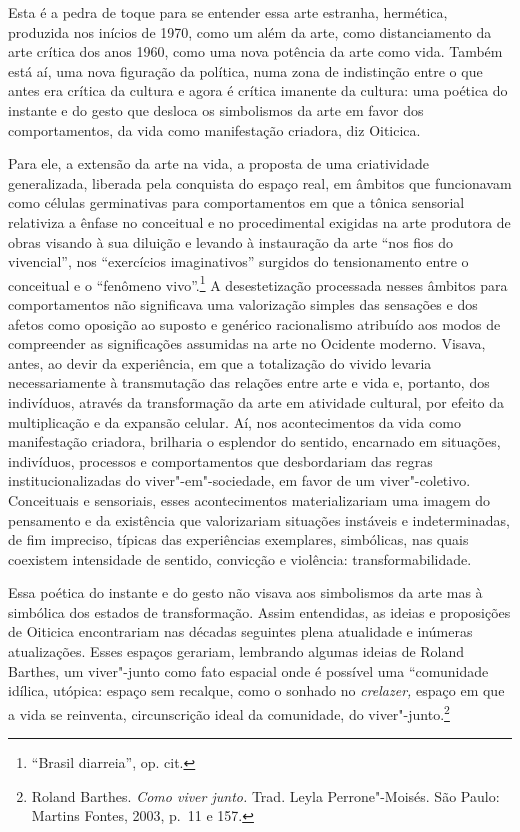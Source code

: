 Esta é a pedra de toque para se entender essa arte estranha, hermética,
produzida nos inícios de 1970, como um além da arte, como distanciamento
da arte crítica dos anos 1960, como uma nova potência da arte como vida.
Também está aí, uma nova figuração da política, numa zona de indistinção
entre o que antes era crítica da cultura e agora é crítica imanente da
cultura: uma poética do instante e do gesto que desloca os simbolismos
da arte em favor dos comportamentos, da vida como manifestação criadora,
diz Oiticica.

Para ele, a extensão da arte na vida, a proposta de uma criatividade
generalizada, liberada pela conquista do espaço real, em âmbitos que
funcionavam como células germinativas para comportamentos em que a
tônica sensorial relativiza a ênfase no conceitual e no procedimental
exigidas na arte produtora de obras visando à sua diluição e levando à
instauração da arte ``nos fios do vivencial'', nos ``exercícios
imaginativos'' surgidos do tensionamento entre o conceitual e o
``fenômeno vivo''.\footnote{``Brasil diarreia'', op. cit.} A
desestetização processada nesses âmbitos para comportamentos não
significava uma valorização simples das sensações e dos afetos como
oposição ao suposto e genérico racionalismo atribuído aos modos de
compreender as significações assumidas na arte no Ocidente moderno.
Visava, antes, ao devir da experiência, em que a totalização do vivido
levaria necessariamente à transmutação das relações entre arte e vida e,
portanto, dos indivíduos, através da transformação da arte em atividade
cultural, por efeito da multiplicação e da expansão celular. Aí, nos
acontecimentos da vida como manifestação criadora, brilharia o esplendor
do sentido, encarnado em situações, indivíduos, processos e
comportamentos que desbordariam das regras institucionalizadas do
viver"-em"-sociedade, em favor de um viver"-coletivo. Conceituais e
sensoriais, esses acontecimentos materializariam uma imagem do
pensamento e da existência que valorizariam situações instáveis e
indeterminadas, de fim impreciso, típicas das experiências exemplares,
simbólicas, nas quais coexistem intensidade de sentido, convicção e
violência: transformabilidade.

Essa poética do instante e do gesto não visava aos simbolismos da arte
mas à simbólica dos estados de transformação. Assim entendidas, as
ideias e proposições de Oiticica encontrariam nas décadas seguintes
plena atualidade e inúmeras atualizações. Esses espaços gerariam,
lembrando algumas ideias de Roland Barthes, um viver"-junto como fato
espacial onde é possível uma ``comunidade idílica, utópica: espaço sem
recalque, como o sonhado no \emph{crelazer,} espaço em que a vida se
reinventa, circunscrição ideal da comunidade, do viver"-junto.\footnote{Roland
  Barthes. \emph{Como viver junto.} Trad. Leyla Perrone"-Moisés. São
  Paulo: Martins Fontes, 2003, p.~11 e 157.}

